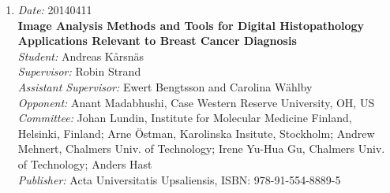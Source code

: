 {\begin{enumerate}
\item
{\em Date:} 20140411~\\
{\bf Image Analysis Methods and Tools for Digital Histopathology Applications Relevant to Breast Cancer Diagnosis}~\\
{\em Student:} Andreas K{\aa}rsn\"{a}s~\\
{\em Supervisor:} Robin Strand~\\
{\em Assistant Supervisor:} Ewert Bengtsson and Carolina W\"{a}hlby~\\
{\em Opponent:} Anant Madabhushi, Case Western Reserve University, OH, US ~\\
{\em Committee:} Johan Lundin, Institute for Molecular Medicine Finland, Helsinki, Finland; Arne \"{O}stman, Karolinska Insitute, Stockholm; Andrew Mehnert, Chalmers Univ. of Technology; Irene Yu-Hua Gu, Chalmers Univ. of Technology; Anders Hast ~\\
{\em Publisher:} Acta Universitatis Upsaliensis, ISBN: 978-91-554-8889-5 ~\\ 

\end{enumerate}}
